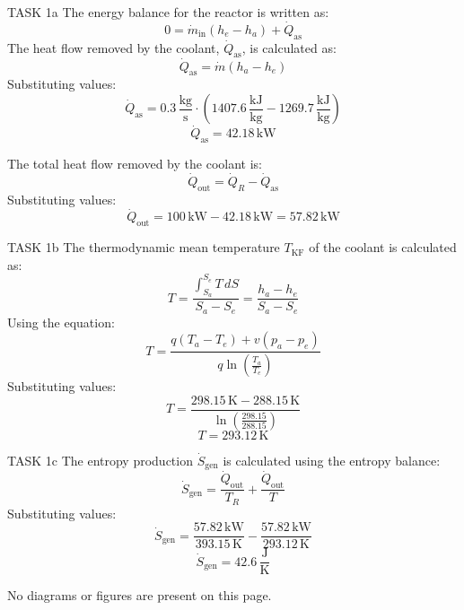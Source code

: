 TASK 1a  
The energy balance for the reactor is written as:  
\[
0 = \dot{m}_{\text{in}} (h_e - h_a) + \dot{Q}_{\text{as}}
\]  
The heat flow removed by the coolant, \( \dot{Q}_{\text{as}} \), is calculated as:  
\[
\dot{Q}_{\text{as}} = \dot{m} (h_a - h_e)
\]  
Substituting values:  
\[
\dot{Q}_{\text{as}} = 0.3 \, \frac{\text{kg}}{\text{s}} \cdot (1407.6 \, \frac{\text{kJ}}{\text{kg}} - 1269.7 \, \frac{\text{kJ}}{\text{kg}})
\]  
\[
\dot{Q}_{\text{as}} = 42.18 \, \text{kW}
\]  

The total heat flow removed by the coolant is:  
\[
\dot{Q}_{\text{out}} = \dot{Q}_R - \dot{Q}_{\text{as}}
\]  
Substituting values:  
\[
\dot{Q}_{\text{out}} = 100 \, \text{kW} - 42.18 \, \text{kW} = 57.82 \, \text{kW}
\]  

TASK 1b  
The thermodynamic mean temperature \( T_{\text{KF}} \) of the coolant is calculated as:  
\[
T = \frac{\int_{S_a}^{S_e} T \, dS}{S_a - S_e} = \frac{h_a - h_e}{S_a - S_e}
\]  
Using the equation:  
\[
T = \frac{q (T_a - T_e) + v (p_a - p_e)}{q \ln \left( \frac{T_a}{T_e} \right)}
\]  
Substituting values:  
\[
T = \frac{298.15 \, \text{K} - 288.15 \, \text{K}}{\ln \left( \frac{298.15}{288.15} \right)}
\]  
\[
T = 293.12 \, \text{K}
\]  

TASK 1c  
The entropy production \( \dot{S}_{\text{gen}} \) is calculated using the entropy balance:  
\[
\dot{S}_{\text{gen}} = \frac{\dot{Q}_{\text{out}}}{T_R} + \frac{\dot{Q}_{\text{out}}}{T}
\]  
Substituting values:  
\[
\dot{S}_{\text{gen}} = \frac{57.82 \, \text{kW}}{393.15 \, \text{K}} - \frac{57.82 \, \text{kW}}{293.12 \, \text{K}}
\]  
\[
\dot{S}_{\text{gen}} = 42.6 \, \frac{\text{J}}{\text{K}}
\]  

No diagrams or figures are present on this page.